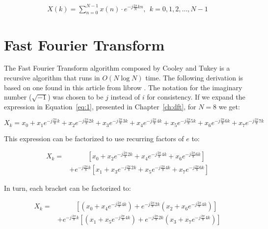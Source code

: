 \begin{align}
    X\left(k\right) = \sum\limits_{n=0}^{N-1}x\left(n\right)\cdot e^{-j\frac{2\pi}{N}kn},\ \ k = 0,1,2,\dots,N-1\label{eq:1}
\end{align}

\section{Fast Fourier Transform}
The Fast Fourier Transform algorithm composed by Cooley and Tukey is a recursive algorithm that runs in $O(N\log{}N)$ time. The following derivation is based on one found in this article from librow \cite{fft:derivation}. The notation for the imaginary number ($\sqrt{-1}$) was chosen to be $j$ instead of $i$ for consistency. If we expand the expression in Equation~\ref{eq:1}, presented in Chapter~\ref{ch:dft}, for $N = 8$ we get:

\begin{equation}
    X_{k} = x_0 + x_1e^{-j\frac{2\pi}{8}k} + x_2e^{-j\frac{2\pi}{8}2k} + x_3e^{-j\frac{2\pi}{8}3k} + x_4e^{-j\frac{2\pi}{8}4k} + x_5e^{-j\frac{2\pi}{8}5k} + x_6e^{-j\frac{2\pi}{8}6k} + x_7e^{-j\frac{2\pi}{8}7k}
\end{equation}\label{eq:first}

This expression can be factorized to use recurring factors of $e$ to:

\begin{equation}
\begin{aligned}
    X_{k} =&\ \ \ \ \ \ \ \ \ \ \ \ \left[x_0 + x_2e^{-j\frac{2\pi}{8}2k} + x_4e^{-j\frac{2\pi}{8}4k} + x_6e^{-j\frac{2\pi}{8}6k}\right]\\
           &+ e^{-j\frac{2\pi}{8}k}\left[x_1 + x_3e^{-j\frac{2\pi}{8}2k} + x_5e^{-j\frac{2\pi}{8}4k} + x_7e^{-j\frac{2\pi}{8}6k}\right]
\end{aligned}\label{eq:second}
\end{equation}

In turn, each bracket can be factorized to:

\begin{equation}
\begin{aligned}
    X_{k} =&\ \ \ \ \ \ \ \ \ \ \ \ \left[\left(x_0 + x_4e^{-j\frac{2\pi}{8}4k}\right) + e^{-j\frac{2\pi}{8}2k}\left(x_2 + x_6e^{-j\frac{2\pi}{8}4k}\right)\right]\\
           &+ e^{-j\frac{2\pi}{8}k}\left[\left(x_1 + x_5e^{-j\frac{2\pi}{8}4k}\right) + e^{-j\frac{2\pi}{8}2k}\left(x_3 + x_7e^{-j\frac{2\pi}{8}4k}\right)\right]
\end{aligned}\label{eq:third}
\end{equation}

